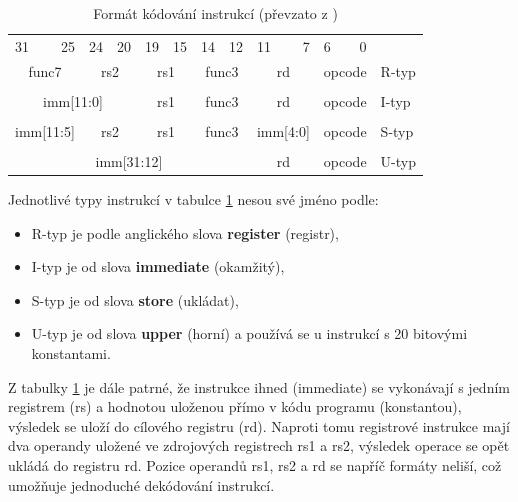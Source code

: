 \documentclass[FM,BP]{tulthesis}
\newcommand{\argument}[1]{{\ttfamily\color{\tulcolor}#1}}
\begin{document}
\begin{table}[h]
    \caption{Formát kódování instrukcí (převzato z \cite{RISC-V})}
    \label{table:RISU}
    \begin{center}
        \begin{tabular}{lrlrlrlrlrlrl}
        31 & 25 & 24 & 20 & 19 & 15 & 14 & 12 & 11 & 7 & 6 & 0 
        \\
        \cline{0-11}
        \multicolumn{2}{|c|}{func7} & \multicolumn{2}{c|}{rs2} & \multicolumn{2}{c|}{rs1} & \multicolumn{2}{c|}{func3} & \multicolumn{2}{c|}{rd} & \multicolumn{2}{c|}{opcode} & R-typ \\
        \cline{0-11}
        \\
        \cline{0-11}
        \multicolumn{4}{|c|}{imm[11:0]} & \multicolumn{2}{c|}{rs1} & \multicolumn{2}{c|}{func3} & \multicolumn{2}{c|}{rd} & \multicolumn{2}{c|}{opcode} & I-typ \\
        \cline{0-11}
        \\
        \cline{0-11}
        \multicolumn{2}{|c|}{imm[11:5]} & \multicolumn{2}{c|}{rs2} & \multicolumn{2}{c|}{rs1} & \multicolumn{2}{c|}{func3} & \multicolumn{2}{c|}{imm[4:0]} & \multicolumn{2}{c|}{opcode} & S-typ \\
        \cline{0-11}
        \\
        \cline{0-11}
        \multicolumn{8}{|c|}{imm[31:12]} & \multicolumn{2}{c|}{rd} & \multicolumn{2}{c|}{opcode} & U-typ \\
        \cline{0-11}
        \end{tabular}
    \end{center}
\end{table}

Jednotlivé typy instrukcí v tabulce \ref{table:RISU} nesou své jméno podle:
\begin{itemize}
    \item \argument{R-typ} je podle anglického slova \textbf{register} (registr),
    \item \argument{I-typ} je od slova \textbf{immediate} (okamžitý),
    \item \argument{S-typ} je od slova \textbf{store} (ukládat),
    \item \argument{U-typ} je od slova \textbf{upper} (horní) a používá se u instrukcí s 20 bitovými konstantami.
\end{itemize}

Z tabulky \ref{table:RISU} je dále patrné, že instrukce ihned (immediate) se vykonávají s jedním registrem (rs) a hodnotou uloženou přímo v kódu programu (konstantou), výsledek se uloží do cílového registru (rd). Naproti tomu registrové instrukce mají dva operandy uložené ve zdrojových registrech rs1 a rs2, výsledek operace se opět ukládá do registru rd.
Pozice operandů rs1, rs2 a rd se napříč formáty neliší, což umožňuje jednoduché dekódování instrukcí.
\end{document}
